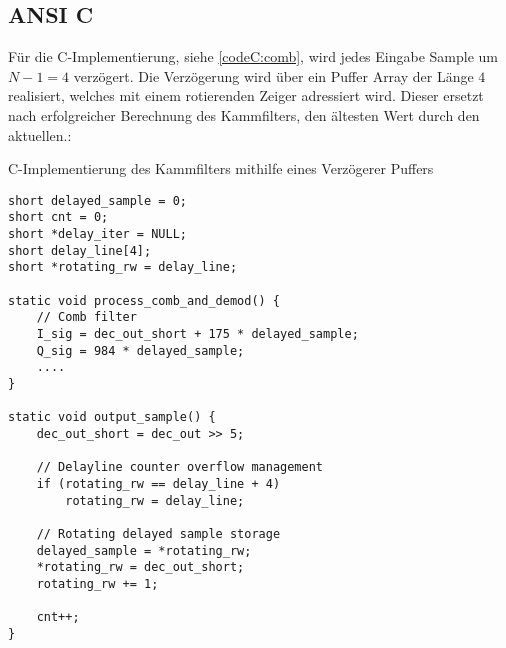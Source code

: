 \documentclass{article}
\begin{document}
\subsection{ANSI C}
Für die C-Implementierung, siehe \ref{codeC:comb}, wird jedes Eingabe Sample um $N - 1 = 4$ verzögert.
Die Verzögerung wird über ein Puffer Array der Länge $4$ realisiert, welches mit einem rotierenden Zeiger adressiert wird. Dieser ersetzt nach erfolgreicher Berechnung des Kammfilters, den ältesten Wert durch den aktuellen.:
\begin{listing}\label{codeC:comb}
    \caption{C-Implementierung des Kammfilters mithilfe eines Verzögerer Puffers}
    \begin{verbatim}
short delayed_sample = 0;
short cnt = 0;
short *delay_iter = NULL;
short delay_line[4];
short *rotating_rw = delay_line;

static void process_comb_and_demod() {
    // Comb filter
    I_sig = dec_out_short + 175 * delayed_sample;
    Q_sig = 984 * delayed_sample;
    ....
}

static void output_sample() {
    dec_out_short = dec_out >> 5;

    // Delayline counter overflow management
    if (rotating_rw == delay_line + 4)
        rotating_rw = delay_line;
    
    // Rotating delayed sample storage
    delayed_sample = *rotating_rw;
    *rotating_rw = dec_out_short;
    rotating_rw += 1;

    cnt++;
}
    \end{verbatim}
\end{listing}
\end{document}
